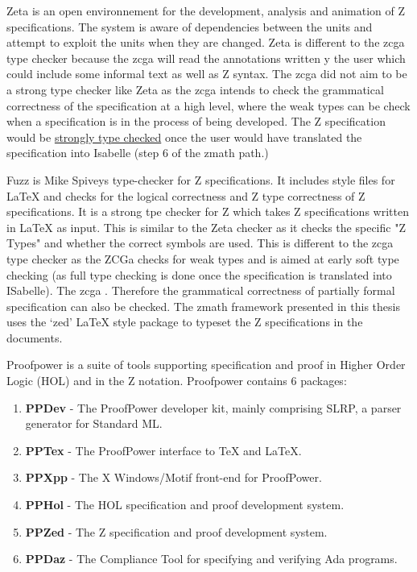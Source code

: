 Zeta \cite{zeta} is an open environnement for the development, analysis and
animation of Z specifications. The system is aware of dependencies between the
units and attempt to exploit the units when they are changed. Zeta is different
to the \gls{zcga} type checker because the \gls{zcga} will read the annotations
written y the user which could include some informal text as well as Z syntax.
The \gls{zcga} did not aim to be a strong type checker like Zeta as the
\gls{zcga} intends to check the grammatical correctness of the specification at
a high level, where the weak types can be check when a specification is in the
process of being developed. The Z specification would be \underline{strongly
type checked} once the user would have translated the specification into
Isabelle (step 6 of the \gls{zmath} path.)

Fuzz \cite{spiveyfuzz} is Mike Spiveys type-checker for Z specifications.
It includes style files for \LaTeX{} and checks for the logical correctness and
Z type correctness of Z specifications. It is a strong tpe checker for Z which
takes Z specifications written in \LaTeX{} as input. This is similar to the Zeta
checker as it checks the specific "Z Types" and whether the correct symbols are
used. This is different to the \gls{zcga} type
checker as the ZCGa checks for weak types and is aimed at early soft type
checking (as full type checking is done once the specification is translated
into ISabelle). The \gls{zcga} . Therefore the grammatical correctness
of partially formal specification can also be checked. The \gls{zmath} framework
presented in this thesis uses the `zed' \LaTeX{} style package to typeset the Z
specifications in the documents.

Proofpower \cite{pp} is a suite of tools supporting specification and proof in
Higher Order Logic (HOL) and in the Z notation. Proofpower contains 6 packages:
\begin{enumerate}
    \item \textbf{PPDev} - The ProofPower developer kit, mainly comprising SLRP, a parser generator for Standard ML.
    \item \textbf{PPTex} - The ProofPower interface to TeX and LaTeX.
    \item \textbf{PPXpp} - The X Windows/Motif front-end for ProofPower.
    \item \textbf{PPHol} - The HOL specification and proof development system.
    \item \textbf{PPZed} - The Z specification and proof development system.
    \item \textbf{PPDaz} - The Compliance Tool for specifying and verifying Ada programs.
\end{enumerate}

